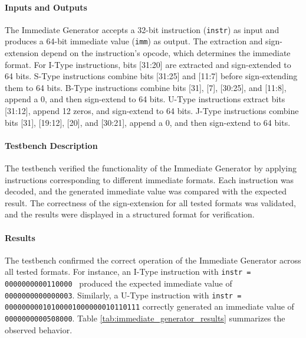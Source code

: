 \documentclass[12pt]{article}
\begin{document}
\paragraph{Inputs and Outputs}
The Immediate Generator accepts a 32-bit instruction (\texttt{instr}) as input and produces a 64-bit immediate value (\texttt{imm}) as output. The extraction and sign-extension depend on the instruction's opcode, which determines the immediate format. For I-Type instructions, bits [31:20] are extracted and sign-extended to 64 bits. S-Type instructions combine bits [31:25] and [11:7] before sign-extending them to 64 bits. B-Type instructions combine bits [31], [7], [30:25], and [11:8], append a 0, and then sign-extend to 64 bits. U-Type instructions extract bits [31:12], append 12 zeros, and sign-extend to 64 bits. J-Type instructions combine bits [31], [19:12], [20], and [30:21], append a 0, and then sign-extend to 64 bits.

\paragraph{Testbench Description}
The testbench verified the functionality of the Immediate Generator by applying instructions corresponding to different immediate formats. Each instruction was decoded, and the generated immediate value was compared with the expected result. The correctness of the sign-extension for all tested formats was validated, and the results were displayed in a structured format for verification.

\paragraph{Results}
The testbench confirmed the correct operation of the Immediate Generator across all tested formats. For instance, an I-Type instruction with \texttt{instr = 0000000000110000 } produced the expected immediate value of \texttt{0000000000000003}. Similarly, a U-Type instruction with \texttt{instr = 00000000010100001000000010110111} correctly generated an immediate value of \texttt{0000000000508000}. Table \ref{tab:immediate_generator_results} summarizes the observed behavior.
\end{document}
